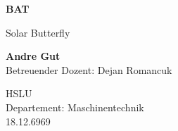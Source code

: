 \begin{titlepage}
    \begin{center}
        \vspace*{1cm}

        \Huge
        \textbf{BAT}

        \vspace{0.5cm}
        \LARGE
        Solar Butterfly

        \vspace{1.5cm}

        \textbf{Andre Gut}\\
        \Large
        Betreuender Dozent: Dejan Romancuk


        \Large
        HSLU\\
        Departement: Maschinentechnik\\
        18.12.6969

    \end{center}
\end{titlepage}
